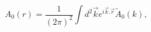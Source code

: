 \begin{equation}
A_{0}(r)=\frac{1}{(2\pi)^{2}}\int d^{2}\overrightarrow{k}e^{i\overrightarrow
{k}.\overrightarrow{r}}\widetilde{A}_{0}(k), \label{F}%
\end{equation}

